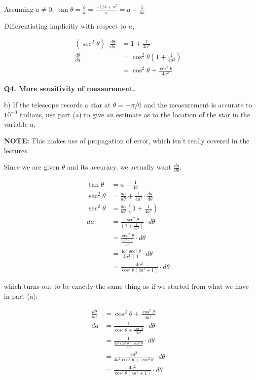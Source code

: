 \documentclass[9pt]{article}
\begin{document}
Assuming $a \neq 0$, $\tan \theta = \frac{b}{a} = \frac{-1/4 + a^2}{a} = a - \frac{1}{4a}$

Differentiating implicitly with respect to $a$,

\begin{align*}
  (\sec^2 \theta) \cdot \frac{d \theta}{da} &= 1 + \frac{1}{4a^2} \\
  \frac{d \theta}{da} &= \cos^2 \theta (1 + \frac{1}{4a^2}) \\
                      &= \cos^2 \theta + \frac{\cos^2 \theta}{4a^2}
\end{align*}

\begin{tcolorbox}
  \textbf{Q4. More sensitivity of measurement.}

  b) If the telescope records a star at $\theta = -\pi / 6$ and the measurement is accurate to $10^{-3}$ radians, use part (a) to give an estimate as to the location of the star in the variable $a$.
\end{tcolorbox}

\textbf{NOTE:} This makes use of propagation of error, which isn't really covered in the lectures.

Since we are given $\theta$ and its accuracy, we actually want $\frac{da}{d \theta}$.

\begin{align*}
  \tan \theta &= a - \frac{1}{4a} \\
  \sec^2 \theta &= \frac{da}{d \theta} + \frac{1}{4a^2} \cdot \frac{da}{d \theta} \\
  \sec^2 \theta &= \frac{da}{d \theta} (1 + \frac{1}{4a^2}) \\
  da &= \frac{\sec^2 \theta}{(1 + \frac{1}{4a^2})} \cdot d \theta \\
     &= \frac{\sec^2 \theta}{\frac{4a^2 + 1}{4a^2}} \cdot d \theta \\
     &= \frac{4a^2 \sec^2 \theta}{4a^2 + 1} \cdot d \theta \\
     &= \frac{4a^2}{\cos^2 \theta (4a^2 + 1)} \cdot d \theta
\end{align*}

which turns out to be exactly the same thing as if we started from what we have in part (a):

\begin{align*}
  \frac{d \theta}{da} &= \cos^2 \theta + \frac{\cos^2 \theta}{4a^2} \\
  da &= \frac{1}{\cos^2 \theta + \frac{\cos^2 \theta}{4a^2}} \cdot d \theta \\
     &= \frac{1}{\frac{4a^2 \cos^2 \theta + \cos^2 \theta}{4a^2}} \cdot d \theta \\
     &= \frac{4a^2}{4a^2 \cos^2 \theta + \cos^2 \theta} \cdot d \theta \\
     &= \frac{4a^2}{\cos^2 \theta (4a^2 + 1)} \cdot d \theta
\end{align*}
\end{document}
